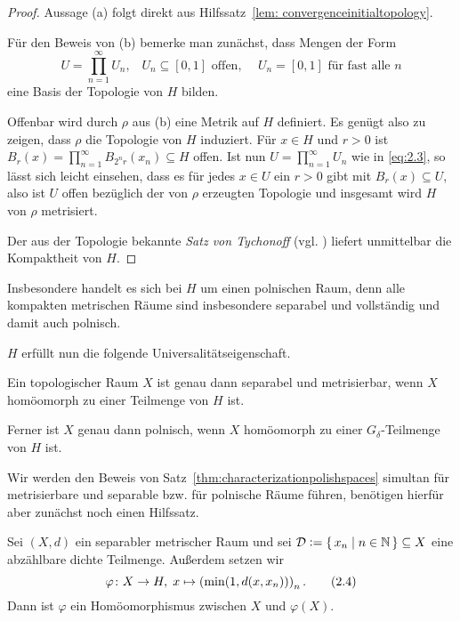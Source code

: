 \documentclass[../main/main.tex]{subfiles}
\begin{document}
	\begin{proof}
		Aussage (a) folgt direkt aus Hilfssatz~\ref{lem: convergenceinitialtopology}.
		
		Für den Beweis von (b) bemerke man zunächst, dass Mengen der Form 
		\[U = \prod_{n=1}^{\infty} U_n\text{,} \quad U_n \subseteq [0, 1] \text{ offen, }
		\quad U_n = [0, 1] \text{ für fast alle } n \label{eq:2.3} \tag{2.3}\]
		eine Basis der Topologie von $H$ bilden.
		
		Offenbar wird durch $\rho$ aus (b) eine Metrik auf $H$ definiert. 
		Es genügt also zu zeigen, dass $\rho$ die Topologie von $H$ induziert. 
		Für $x \in H$ und $r > 0$ ist 
		$B_r(x) = \prod_{n=1}^{\infty} B_{2^n r}(x_n) \subseteq H$ 
		offen. Ist nun $U = \prod_{n=1}^{\infty} U_n$ wie in \eqref{eq:2.3}, 
		so lässt sich leicht einsehen, dass es für jedes $x \in U$ ein $r > 0$ 
		gibt mit $B_r(x) \subseteq U$, also ist $U$ offen bezüglich der von $\rho$ 
		erzeugten Topologie und insgesamt wird $H$ von $\rho$ metrisiert.
		
		Der aus der Topologie bekannte \emph{Satz von Tychonoff} (vgl. \cite[Satz 2.7.1]{Simon.2015}) liefert 
		unmittelbar die Kompaktheit von $H$.
	\end{proof}

	\begin{Bemerkung}
		Insbesondere handelt es sich bei $H$ um einen polnischen Raum, denn alle kompakten metrischen Räume sind insbesondere 
		separabel und vollständig und damit auch polnisch.
	\end{Bemerkung}
	
	$H$ erfüllt nun die folgende Universalitätseigenschaft.
	
	\begin{Satz}
		\label{thm:characterizationpolishspaces}
		Ein topologischer Raum $X$ ist genau dann separabel und metrisierbar, wenn $X$ homöomorph zu einer Teilmenge von $H$ ist.
		
		Ferner ist $X$ genau dann polnisch, wenn $X$ homöomorph zu einer $G_\delta$-Teilmenge von $H$ ist.
	\end{Satz}
	
	Wir werden den Beweis von Satz~\ref{thm:characterizationpolishspaces} simultan für metrisierbare und 
	separable bzw. für polnische Räume führen, benötigen hierfür aber zunächst noch einen Hilfssatz.
	
	\begin{Hilfssatz}
		\label{lem:characterizationpolishspaces}
		Sei $(X, d)$ ein separabler metrischer Raum und sei 
		$\mathcal{D} \vcentcolon = \left\{\, x_n \; \middle| \; n \in \mathbb{N} \,\right\} \subseteq X$ eine abzählbare 
		dichte Teilmenge. Außerdem setzen wir
		\[\varphi \colon X \to H, \; x \mapsto \left(\min (1, d(x, x_n)) \right)_n  \text{.} \label{eq:2.4} \tag{2.4}\]
		Dann ist $\varphi$ ein Homöomorphismus zwischen $X$ und $\varphi(X)$.
	\end{Hilfssatz}
	
\end{document}
